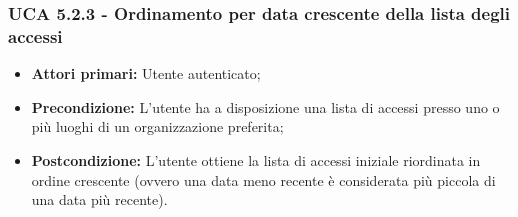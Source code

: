\subsubsection{UCA 5.2.3 - Ordinamento per data crescente della lista degli accessi}
\begin{itemize}
    \item \textbf{Attori primari:} Utente autenticato;
    \item \textbf{Precondizione:} L'utente ha a disposizione una lista di accessi presso uno o più luoghi di un organizzazione preferita;
    \item \textbf{Postcondizione:} L'utente ottiene la lista di accessi iniziale riordinata in ordine crescente (ovvero una data meno recente è considerata più piccola di una data più recente).
\end{itemize}


